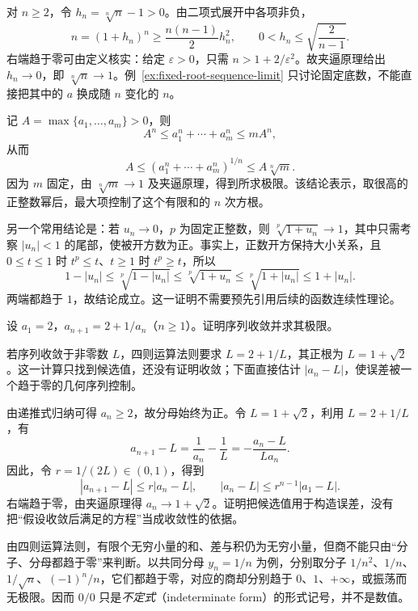 \begin{solve}
对 $n\geq2$，令 $h_n=\sqrt[n]{n}-1>0$。由二项式展开中各项非负，
\[
    n=(1+h_n)^n\geq\frac{n(n-1)}2h_n^2,
    \qquad 0<h_n\leq\sqrt{\frac2{n-1}}.
\]
右端趋于零可由定义核实：给定 $\varepsilon>0$，只需 $n>1+2/\varepsilon^2$。故夹逼原理给出 $h_n\to0$，即 $\sqrt[n]{n}\to1$。例~\ref{ex:fixed-root-sequence-limit} 只讨论固定底数，不能直接把其中的 $a$ 换成随 $n$ 变化的 $n$。

记 $A=\max\{a_1,\ldots,a_m\}>0$，则
\[
    A^n\leq a_1^n+\cdots+a_m^n\leq mA^n,
\]
从而
\[
    A\leq\left(a_1^n+\cdots+a_m^n\right)^{1/n}\leq A\sqrt[n]{m}.
\]
因为 $m$ 固定，由 $\sqrt[n]{m}\to1$ 及夹逼原理，得到所求极限。该结论表示，取很高的正整数幂后，最大项控制了这个有限和的 $n$ 次方根。
\end{solve}

另一个常用结论是：若 $u_n\to0$，$p$ 为固定正整数，则 $\sqrt[p]{1+u_n}\to1$，其中只需考察 $|u_n|<1$ 的尾部，使被开方数为正。事实上，正数开方保持大小关系，且 $0\leq t\leq1$ 时 $t^p\leq t$、$t\geq1$ 时 $t^p\geq t$，所以
\[
    1-|u_n|\leq\sqrt[p]{1-|u_n|}
    \leq\sqrt[p]{1+u_n}\leq\sqrt[p]{1+|u_n|}\leq1+|u_n|.
\]
两端都趋于 $1$，故结论成立。这一证明不需要预先引用后续的函数连续性理论。

\begin{example}
\label{ex:recurrence-sequence-geometric-error-bound}
设 $a_1=2$，$a_{n+1}=2+1/a_n$（$n\geq1$）。证明序列收敛并求其极限。
\end{example}

\begin{analyze}
若序列收敛于非零数 $L$，四则运算法则要求 $L=2+1/L$，其正根为 $L=1+\sqrt2$。这一计算只找到候选值，还没有证明收敛；下面直接估计 $|a_n-L|$，使误差被一个趋于零的几何序列控制。
\end{analyze}

\begin{solve}
由递推式归纳可得 $a_n\geq2$，故分母始终为正。令 $L=1+\sqrt2$，利用 $L=2+1/L$，有
\[
    a_{n+1}-L=\frac1{a_n}-\frac1L=-\frac{a_n-L}{La_n}.
\]
因此，令 $r=1/(2L)\in(0,1)$，得到
\[
    |a_{n+1}-L|\leq r|a_n-L|,
    \qquad |a_n-L|\leq r^{n-1}|a_1-L|.
\]
右端趋于零，由夹逼原理得 $a_n\to1+\sqrt2$。证明把候选值用于构造误差，没有把“假设收敛后满足的方程”当成收敛性的依据。
\end{solve}

由四则运算法则，有限个无穷小量的和、差与积仍为无穷小量，但商不能只由“分子、分母都趋于零”来判断。以共同分母 $y_n=1/n$ 为例，分别取分子 $1/n^2$、$1/n$、$1/\sqrt n$、$(-1)^n/n$，它们都趋于零，对应的商却分别趋于 $0$、$1$、$+\infty$，或振荡而无极限。因而 $0/0$ 只是\emph{不定式}（indeterminate form）的形式记号，并不是数值。

